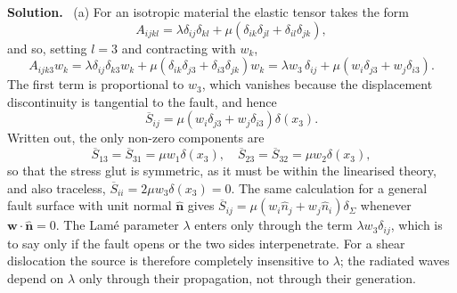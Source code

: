 \documentclass[a4paper,12pt]{paper}
\newenvironment{solution}{\par\noindent\textbf{Solution.}\ }{\par\medskip}
\begin{document}
\begin{solution}
(a) For an isotropic material the elastic tensor takes the form
\begin{equation}
A_{ijkl}=\lambda\delta_{ij}\delta_{kl}+\mu\left(\delta_{ik}\delta_{jl}+\delta_{il}\delta_{jk}\right),
\label{eq:1}
\end{equation}
and so, setting $l=3$ and contracting with $w_{k}$,
\begin{equation}
A_{ijk3}w_{k}=\lambda\delta_{ij}\delta_{k3}w_{k}+\mu\left(\delta_{ik}\delta_{j3}+\delta_{i3}\delta_{jk}\right)w_{k}
=\lambda w_{3}\,\delta_{ij}+\mu\left(w_{i}\delta_{j3}+w_{j}\delta_{i3}\right).
\label{eq:2}
\end{equation}
The first term is proportional to $w_{3}$, which vanishes because the displacement
discontinuity is tangential to the fault, and hence
\begin{equation}
\overline{S}_{ij}=\mu\left(w_{i}\delta_{j3}+w_{j}\delta_{i3}\right)\delta(x_{3}).
\label{eq:3}
\end{equation}
Written out, the only non-zero components are
\begin{equation}
\overline{S}_{13}=\overline{S}_{31}=\mu w_{1}\delta(x_{3}),\quad
\overline{S}_{23}=\overline{S}_{32}=\mu w_{2}\delta(x_{3}),
\label{eq:4}
\end{equation}
so that the stress glut is symmetric, as it must be within the linearised theory, and also
traceless, $\overline{S}_{ii}=2\mu w_{3}\delta(x_{3})=0$. The same calculation for a general
fault surface with unit normal $\hat{\mathbf{n}}$ gives
$\overline{S}_{ij}=\mu(w_{i}\hat{n}_{j}+w_{j}\hat{n}_{i})\delta_{\Sigma}$ whenever
$\mathbf{w}\cdot\hat{\mathbf{n}}=0$. The Lam\'{e} parameter $\lambda$ enters only through the
term $\lambda w_{3}\delta_{ij}$, which is to say only if the fault opens or the two sides
interpenetrate. For a shear dislocation the source is therefore completely insensitive to
$\lambda$; the radiated waves depend on $\lambda$ only through their propagation, not
through their generation.


\end{solution}
\end{document}
